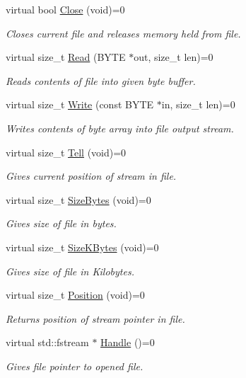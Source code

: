 \begin{DoxyCompactItemize}
virtual bool \hyperlink{classHatchit_1_1Core_1_1IFile_a3e604bf80e604d22adfd10475693213e}{Close} (void)=0
\begin{DoxyCompactList}\small\item\em Closes current file and releases memory held from file. \end{DoxyCompactList}\item 
virtual size\+\_\+t \hyperlink{classHatchit_1_1Core_1_1IFile_ab6270f8bde6a526cce3f3a2838bb1331}{Read} (B\+Y\+TE $\ast$out, size\+\_\+t len)=0
\begin{DoxyCompactList}\small\item\em Reads contents of file into given byte buffer. \end{DoxyCompactList}\item 
virtual size\+\_\+t \hyperlink{classHatchit_1_1Core_1_1IFile_a227ad957bbc544111b84871cdc0c2c32}{Write} (const B\+Y\+TE $\ast$in, size\+\_\+t len)=0
\begin{DoxyCompactList}\small\item\em Writes contents of byte array into file output stream. \end{DoxyCompactList}\item 
virtual size\+\_\+t \hyperlink{classHatchit_1_1Core_1_1IFile_aaa6d3d85bfbbb1edb19be32e8cf271c4}{Tell} (void)=0
\begin{DoxyCompactList}\small\item\em Gives current position of stream in file. \end{DoxyCompactList}\item 
virtual size\+\_\+t \hyperlink{classHatchit_1_1Core_1_1IFile_a804338c824b2cb4047e45a6b9b62b910}{Size\+Bytes} (void)=0
\begin{DoxyCompactList}\small\item\em Gives size of file in bytes. \end{DoxyCompactList}\item 
virtual size\+\_\+t \hyperlink{classHatchit_1_1Core_1_1IFile_aea3fd028436c4e75967b065d5655ca0b}{Size\+K\+Bytes} (void)=0
\begin{DoxyCompactList}\small\item\em Gives size of file in Kilobytes. \end{DoxyCompactList}\item 
virtual size\+\_\+t \hyperlink{classHatchit_1_1Core_1_1IFile_aa03495bd6404a082c0b0fe53c7e383d0}{Position} (void)=0
\begin{DoxyCompactList}\small\item\em Returns position of stream pointer in file. \end{DoxyCompactList}\item 
virtual std\+::fstream $\ast$ \hyperlink{classHatchit_1_1Core_1_1IFile_aa9673f333160b5d2b75f1800fb950b21}{Handle} ()=0
\begin{DoxyCompactList}\small\item\em Gives file pointer to opened file. \end{DoxyCompactList}\end{DoxyCompactItemize}
